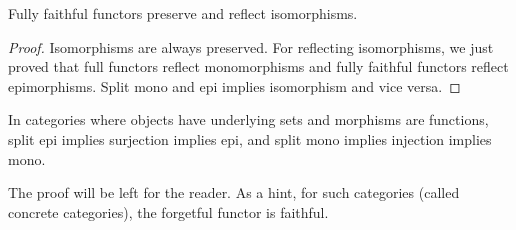 \documentclass[12pt,reqno]{amsart}
\numberwithin{theorem}{section}
\theoremstyle{definition}
\theoremstyle{remark}
\numberwithin{equation}{section}
\theoremstyle{definition}
\begin{document}
\begin{corollary}
    Fully faithful functors preserve and reflect isomorphisms.
\end{corollary}
\begin{proof}
    Isomorphisms are always preserved. For reflecting isomorphisms, we just proved that full functors reflect monomorphisms and fully faithful functors reflect epimorphisms. Split mono and epi implies isomorphism and vice versa.
\end{proof}
\begin{proposition}
    In categories where objects have underlying sets and morphisms are functions, split epi implies surjection implies epi, and split mono implies injection implies mono.
\end{proposition}
The proof will be left for the reader. As a hint, for such categories (called concrete categories), the forgetful functor is faithful.
\end{document}
